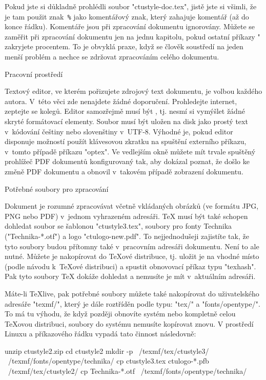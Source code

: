 Pokud jste si důkladně prohlédli soubor "ctustyle-doc.tex", jistě jste si všimli, že
je tam použit znak~{\tt\%} jako komentářový znak, který zahajuje komentář
(až do konce řádku). Komentáře jsou při zpracování dokumentu ignorovány. 
Můžete se zaměřit při zpracování dokumentu jen na jednu kapitolu, pokud ostatní
příkazy " zakryjete procentem. To je obvyklá praxe, když se
člověk soustředí na jeden menší problém a nechce se zdržovat zpracováním
celého dokumentu.


\sec Pracovní prostředí

Textový editor, ve kterém pořizujete zdrojový text dokumentu, je volbou
každého autora. V~této věci zde nenajdete žádné doporučení. Prohledejte
internet, zeptejte se kolegů. Editor samozřejmě musí být , tj. nesmí si vymýšlet žádné skryté formátovací elementy. Soubor
musí být uložen na disk jako prostý text v~kódování češtiny nebo slovenštiny 
v~UTF-8. Výhodné je, pokud editor disponuje možností použít klávesovou zkratku
na spuštění externího příkazu, v~tomto případě příkazu 
"optex". Ve vedlejším okně můžete mít trvale spuštěný prohlížeč PDF
dokumentů konfigurovaný tak, aby dokázal poznat, že došlo ke
změně PDF dokumentu a obnovil v~takovém případě zobrazení dokumentu.

\sec Potřebné soubory pro zpracování

Dokument je rozumné zpracovávat včetně vkládaných obrázků (ve formátu JPG,
PNG nebo PDF) v~jednom vyhrazeném adresáři. \TeX{} musí být také schopen
dohledat soubor se šablonou "ctustyle3.tex", soubory pro fonty Technika 
("Technika-*.otf") a logo
"ctulogo-new.pdf". To nejjednodušeji zajistíte tak, že tyto soubory budou
přítomny také v~pracovním adresáři dokumentu. 
Není to ale nutné. Můžete je nakopírovat do \TeX{}ové distribuce, tj. uložit
je na vhodné místo (podle návodu k~\TeX{}ové distribuci) a spustit
obnovovací příkaz typu "texhash". Pak tyto soubory \TeX{} dokáže dohledat a
nemusíte je mít v~aktuálním adresáři. 

Máte-li \TeX{}live, pak potřebné soubory můžete také nakopírovat do
uživatelského adresáře "texmf/", který je dále roztříděn podle typu: 
"tex/" a "fonts/opentype/". 
To má tu výhodu, že když později obnovíte systém nebo
kompletně celou \TeX{}ovou distribuci, soubory do
systému nemusíte kopírovat znovu. V prostředí Linuxu a příkazového řádku
vypadá tato činnost následovně:

\begtt
unzip ctustyle2.zip
cd ctustyle2
mkdir -p ~/texmf/tex/ctustyle3/ ~/texmf/fonts/opentype/technika/
cp ctustyle3.tex ctulogo-*.pfb ~/texmf/tex/ctustyle2/
cp Technika-*.otf ~/texmf/fonts/opentype/technika/
\endtt

